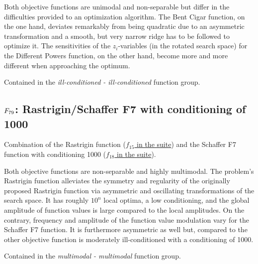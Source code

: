 Both objective functions are unimodal and non-separable but differ in the
difficulties provided to an optimization algorithm.
The Bent Cigar function, on the one hand, deviates remarkably
from being quadratic due to an asymmetric transformation and a smooth,
but very narrow ridge has to be followed to optimize it.
The sensitivities of the
\(z_i\)-variables (in the rotated search space)
for the Different Powers function, on the other hand,
become more and more different when
approaching the optimum.

Contained in the \emph{ill-conditioned - ill-conditioned} function group.



\subsection[\texorpdfstring{\protect\(F_{79}\protect\): Rastrigin/Schaffer F7 with conditioning of 1000}{F79: Rastrigin/Schaffer F7 with conditioning of 1000}]{\texorpdfstring{\protect\(F_{79}\protect\): Rastrigin/Schaffer F7 with conditioning of 1000}{}}
\label{index:rastrigin-schaffer-f7-with-conditioning-of-1000}\label{index:f79}
Combination of the Rastrigin function (\href{https://coco.gforge.inria.fr/downloads/download16.00/bbobdocfunctions.pdf\#page=75}{\(f_{15}\) in the \bbob suite}) and the
Schaffer F7 function with conditioning 1000 (\href{https://coco.gforge.inria.fr/downloads/download16.00/bbobdocfunctions.pdf\#page=90}{\(f_{18}\) in the \bbob suite}).

Both objective functions are non-separable and highly multimodal.
The problem's Rastrigin function alleviates the symmetry and regularity of
the originally proposed Rastrigin function via asymmetric and oscillating
transformations of the search space. It has roughly \(10^n\) local optima,
a low conditioning, and the global amplitude of function values is large
compared to the local amplitudes.
On the contrary, frequency  and  amplitude  of  the  function value modulation
vary for the Schaffer F7 function. It is furthermore asymmetric as well
but, compared to the other objective function is moderately ill-conditioned
with a conditioning of 1000.

Contained in the \emph{multimodal - multimodal} function group.



